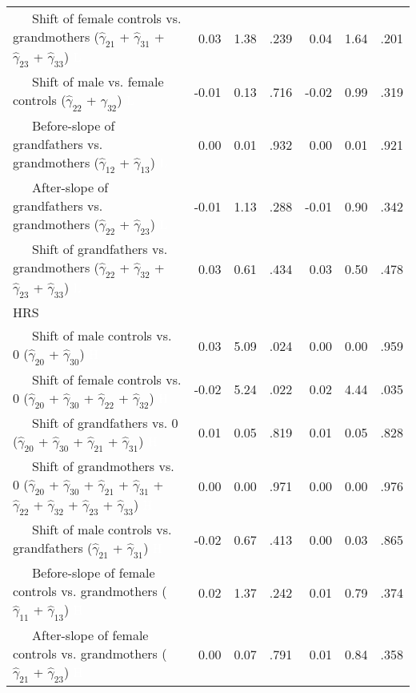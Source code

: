\documentclass[
  english,
  man, noextraspace,floatsintext]{apa7}
\newenvironment{lltable}{\begin{landscape}\begin{center}\begin{ThreePartTable}}{\end{ThreePartTable}\end{center}\end{landscape}}
\begin{document}
\begin{appendix}
\begin{lltable}
{\begin{longtable}{lrrrrrr}
\ \ \ Shift of female controls vs. grandmothers 
($\hat{\gamma}_{21}$ + $\hat{\gamma}_{31}$ + 
$\hat{\gamma}_{23}$ + $\hat{\gamma}_{33}$) \textcolor{white}{L} & 0.03 & 1.38 & .239 & 0.04 & 1.64 & .201\\
\ \ \ Shift of male vs. female controls 
($\hat{\gamma}_{22}$ + $\hat{\gamma}_{32}$) \textcolor{white}{L} & -0.01 & 0.13 & .716 & -0.02 & 0.99 & .319\\
\ \ \ Before-slope of grandfathers vs. grandmothers 
($\hat{\gamma}_{12}$ + $\hat{\gamma}_{13}$) \textcolor{white}{L} & 0.00 & 0.01 & .932 & 0.00 & 0.01 & .921\\
\ \ \ After-slope of grandfathers vs. grandmothers 
($\hat{\gamma}_{22}$ + $\hat{\gamma}_{23}$) \textcolor{white}{L} & -0.01 & 1.13 & .288 & -0.01 & 0.90 & .342\\
\ \ \ Shift of grandfathers vs. grandmothers 
($\hat{\gamma}_{22}$ + $\hat{\gamma}_{32}$ + 
$\hat{\gamma}_{23}$ + $\hat{\gamma}_{33}$) \textcolor{white}{L} & 0.03 & 0.61 & .434 & 0.03 & 0.50 & .478\\
HRS &  &  &  &  &  & \\
\ \ \ Shift of male controls vs. 0 ($\hat{\gamma}_{20}$ + 
$\hat{\gamma}_{30}$) \textcolor{white}{H} & 0.03 & 5.09 & .024 & 0.00 & 0.00 & .959\\
\ \ \ Shift of female controls vs. 0 ($\hat{\gamma}_{20}$ + 
$\hat{\gamma}_{30}$ + $\hat{\gamma}_{22}$ + 
$\hat{\gamma}_{32}$) \textcolor{white}{H} & -0.02 & 5.24 & .022 & 0.02 & 4.44 & .035\\
\ \ \ Shift of grandfathers vs. 0 ($\hat{\gamma}_{20}$ + 
$\hat{\gamma}_{30}$ + $\hat{\gamma}_{21}$ + 
$\hat{\gamma}_{31}$) \textcolor{white}{H} & 0.01 & 0.05 & .819 & 0.01 & 0.05 & .828\\
\ \ \ Shift of grandmothers vs. 0 ($\hat{\gamma}_{20}$ + 
$\hat{\gamma}_{30}$ + $\hat{\gamma}_{21}$ + 
$\hat{\gamma}_{31}$ + $\hat{\gamma}_{22}$ + 
$\hat{\gamma}_{32}$ + $\hat{\gamma}_{23}$ +
$\hat{\gamma}_{33}$) \textcolor{white}{H} & 0.00 & 0.00 & .971 & 0.00 & 0.00 & .976\\
\ \ \ Shift of male controls vs. grandfathers 
($\hat{\gamma}_{21}$ + $\hat{\gamma}_{31}$) \textcolor{white}{H} & -0.02 & 0.67 & .413 & 0.00 & 0.03 & .865\\
\ \ \ Before-slope of female controls vs. grandmothers 
($\hat{\gamma}_{11}$ + $\hat{\gamma}_{13}$) \textcolor{white}{H} & 0.02 & 1.37 & .242 & 0.01 & 0.79 & .374\\
\ \ \ After-slope of female controls vs. grandmothers 
($\hat{\gamma}_{21}$ + $\hat{\gamma}_{23}$) \textcolor{white}{H} & 0.00 & 0.07 & .791 & 0.01 & 0.84 & .358\\

\end{longtable}}
\end{lltable}
\end{appendix}
\end{document}
